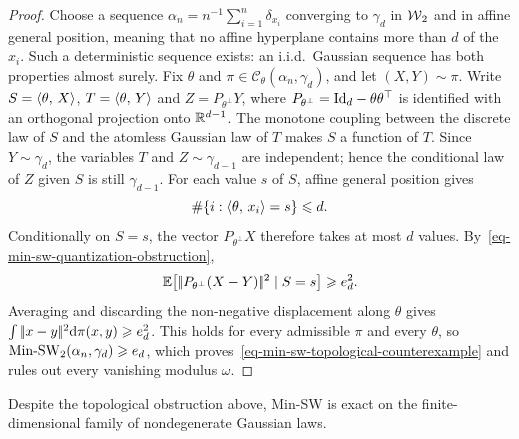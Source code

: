 \begin{proof}
	Choose a sequence $\alpha_n=n^{-1}\sum_{i=1}^n\delta_{x_i}$ converging to $\gamma_d$ in $\operatorname{\mathcal{W}}_2$ and in affine general position, meaning that no affine hyperplane contains more than $d$ of the $x_i$. Such a deterministic sequence exists: an i.i.d.\ Gaussian sequence has both properties almost surely. Fix $\theta$ and $\pi\in\mathcal C_\theta(\alpha_n,\gamma_d)$, and let $(X,Y)\sim\pi$. Write
	$S=\langle \theta,\,X\rangle$, $T=\langle \theta,\,Y\rangle$ and $Z=P_{\theta^\perp}Y$, where $P_{\theta^\perp}=\mathrm{Id}_d-\theta\theta^\top$ is identified with an orthogonal projection onto $\mathbb{R}^{d-1}$. The monotone coupling between the discrete law of $S$ and the atomless Gaussian law of $T$ makes $S$ a function of $T$. Since $Y\sim\gamma_d$, the variables $T$ and $Z\sim\gamma_{d-1}$ are independent; hence the conditional law of $Z$ given $S$ is still $\gamma_{d-1}$. For each value $s$ of $S$, affine general position gives
	\[
		\#\{i:\langle \theta,\,x_i\rangle=s\}\leqslant d.
	\]
	Conditionally on $S=s$, the vector $P_{\theta^\perp}X$ therefore takes at most $d$ values. By~\eqref{eq-min-sw-quantization-obstruction},
	\[
		\mathbb{E}\!\left[|\!| P_{\theta^\perp}(X-Y) |\!|^2\mid S=s\right]\geqslant e_d^2.
	\]
	Averaging and discarding the non-negative displacement along $\theta$ gives
	$\int|\!| x-y |\!|^2\mathrm{d}\pi(x,y)\geqslant e_d^2$. This holds for every admissible $\pi$ and every $\theta$, so
	$\operatorname{Min\text{-}SW}_2(\alpha_n,\gamma_d)\geqslant e_d$, which proves~\eqref{eq-min-sw-topological-counterexample} and rules out every vanishing modulus $\omega$.
\end{proof}

Despite the topological obstruction above, Min-SW is exact on the finite-dimensional family of nondegenerate Gaussian laws.

